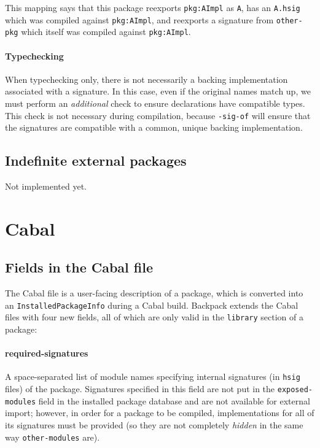 \documentclass{article}
\newcommand{\Red}[1]{{\color{red} #1}}
\begin{document}
This mapping says that this package reexports \texttt{pkg:AImpl} as
\texttt{A}, has an \texttt{A.hsig} which was compiled against
\texttt{pkg:AImpl}, and reexports a signature from \texttt{other-pkg}
which itself was compiled against \texttt{pkg:AImpl}.

\paragraph{Typechecking}  \Red{When typechecking only, there is not
necessarily a backing implementation associated with a signature.  In
this case, even if the original names match up, we must perform an
\emph{additional} check to ensure declarations have compatible types.}
This check is not necessary during compilation, because \texttt{-sig-of}
will ensure that the signatures are compatible with a common, unique
backing implementation.

\subsection{Indefinite external packages}

\Red{Not implemented yet.}

\section{Cabal}

\subsection{Fields in the Cabal file}

The Cabal file is a user-facing description of a package, which is
converted into an \texttt{InstalledPackageInfo} during a Cabal build.
Backpack extends the Cabal files with four new fields, all of which
are only valid in the \texttt{library} section of a package:

\paragraph{required-signatures}  A space-separated list of module names
specifying internal signatures (in \texttt{hsig} files) of the package.
\Red{Signatures specified in this field are not put in the \texttt{exposed-modules} field in the installed package database and
are not available for external import}; however, in order for a package to be
compiled, implementations for all of its signatures must be provided (so
they are not completely \emph{hidden} in the same way \texttt{other-modules} are).
\end{document}
